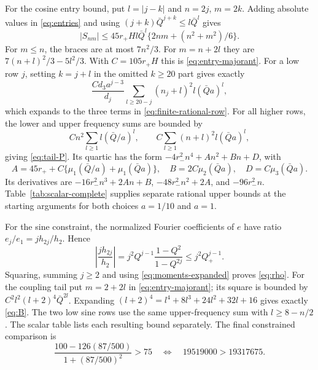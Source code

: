 For the cosine entry bound, put $l=|j-k|$ and $n=2j$, $m=2k$.
Adding absolute values in \eqref{eq:entries} and using
$(j+k)\bar Q^{j+k}\le l\bar Q^l$ gives
\[
 |S_{nm}|\le45r_+Hl\bar Q^l
     \{2nm+(n^2+m^2)/6\}.
\]
For $m\le n$, the braces are at most $7n^2/3$. For $m=n+2l$ they
are $7(n+l)^2/3-5l^2/3$. With $C=105r_+H$ this is
\eqref{eq:entry-majorant}. For a low row $j$, setting $k=j+l$ in
the omitted $k\ge20$ part gives exactly
\[
 \frac{Cd_3a^{j-3}}{d_j}
 \sum_{l\ge20-j}(n_j+l)^2l(\bar Qa)^l,
\]
which expands to the three terms in \eqref{eq:finite-rational-row}.
For all higher rows, the lower and upper frequency sums are bounded by
\[
 Cn^2\sum_{l\ge1}l(\bar Q/a)^l,
 \qquad C\sum_{l\ge1}(n+l)^2l(\bar Qa)^l,
\]
giving \eqref{eq:tail-P}. Its quartic has the form
$-4r_-^2n^4+An^2+Bn+D$, with
\[
 A=45r_++C\{\mu_1(\bar Q/a)+\mu_1(\bar Qa)\},\quad
 B=2C\mu_2(\bar Qa),\quad D=C\mu_3(\bar Qa).
\]
Its derivatives are $-16r_-^2n^3+2An+B$,
$-48r_-^2n^2+2A$, and $-96r_-^2n$.
Table~\ref{tab:scalar-complete} supplies separate rational upper bounds at
the starting arguments for both choices $a=1/10$ and $a=1$.

For the sine constraint, the normalized Fourier coefficients of $e$ have
ratio $e_j/e_1=jh_{2j}/h_2$. Hence
\[
 \left|\frac{jh_{2j}}{h_2}\right|
 =j^2Q^{j-1}\frac{1-Q^2}{1-Q^{2j}}\le j^2Q_+^{j-1}.
\]
Squaring, summing $j\ge2$ and using \eqref{eq:moments-expanded} proves
\eqref{eq:rho}. For the coupling tail put $m=2+2l$ in
\eqref{eq:entry-majorant}; its square is bounded by
$C^2l^2(l+2)^4\bar Q^{2l}$. Expanding
$(l+2)^4=l^4+8l^3+24l^2+32l+16$ gives exactly
\eqref{eq:B}. The two low sine rows use the same upper-frequency sum with
$l\ge8-n/2$. The scalar table lists each resulting bound separately.
The final constrained comparison is
\[
 \frac{100-126(87/500)}{1+(87/500)^2}>75
 \quad\Longleftrightarrow\quad19519000>19317675.
\]

